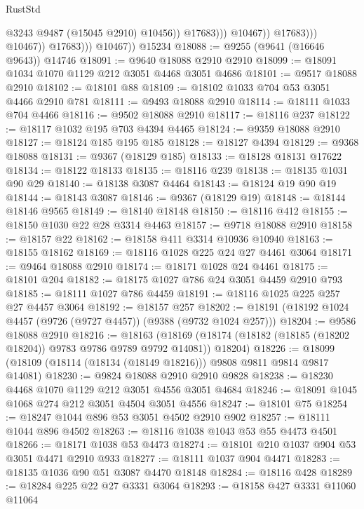 \begin{lexlean}{RustStd}
\begin{coremodule}
                                      @3243
                                      @9487
                                      (@15045 @2910)
                                      @10456))
                                  @17683)))
                            @10467))
                        @17683)))
                  @10467))
              @17683)))
        @10467))
    @15234
@18088 := @9255 (@9641 (@16646 @9643)) @14746
@18091 := @9640 @18088 @2910 @2910
@18099 := @18091 @1034 @1070 @1129 @212 @3051 @4468 @3051 @4686
@18101 := @9517 @18088 @2910
@18102 := @18101 @88
@18109 := @18102 @1033 @704 @53 @3051 @4466 @2910 @781
@18111 := @9493 @18088 @2910
@18114 := @18111 @1033 @704 @4466
@18116 := @9502 @18088 @2910
@18117 := @18116 @237
@18122 := @18117 @1032 @195 @703 @4394 @4465
@18124 := @9359 @18088 @2910
@18127 := @18124 @185 @195 @185
@18128 := @18127 @4394
@18129 := @9368 @18088
@18131 := @9367 (@18129 @185)
@18133 := @18128 @18131 @17622
@18134 := @18122 @18133
@18135 := @18116 @239
@18138 := @18135 @1031 @90 @29
@18140 := @18138 @3087 @4464
@18143 := @18124 @19 @90 @19
@18144 := @18143 @3087
@18146 := @9367 (@18129 @19)
@18148 := @18144 @18146 @9565
@18149 := @18140 @18148
@18150 := @18116 @412
@18155 := @18150 @1030 @22 @28 @3314 @4463
@18157 := @9718 @18088 @2910
@18158 := @18157 @22
@18162 := @18158 @411 @3314 @10936 @10940
@18163 := @18155 @18162
@18169 := @18116 @1028 @225 @24 @27 @4461 @3064
@18171 := @9464 @18088 @2910
@18174 := @18171 @1028 @24 @4461
@18175 := @18101 @204
@18182 := @18175 @1027 @786 @24 @3051 @4459 @2910 @793
@18185 := @18111 @1027 @786 @4459
@18191 := @18116 @1025 @225 @257 @27 @4457 @3064
@18192 := @18157 @257
@18202 := @18191 (@18192 @1024 @4457 (@9726 (@9727 @4457)) (@9388 (@9732 @1024 @257)))
@18204 := @9586 @18088 @2910
@18216 := @18163
    (@18169 (@18174 (@18182 (@18185 (@18202 @18204)) @9783 @9786 @9789 @9792 @14081)) @18204)
@18226 := @18099 (@18109 (@18114 (@18134 (@18149 @18216))) @9808 @9811 @9814 @9817 @14081)
@18230 := @9824 @18088 @2910 @2910 @9828
@18238 := @18230 @4468 @1070 @1129 @212 @3051 @4556 @3051 @4684
@18246 := @18091 @1045 @1068 @274 @212 @3051 @4504 @3051 @4556
@18247 := @18101 @75
@18254 := @18247 @1044 @896 @53 @3051 @4502 @2910 @902
@18257 := @18111 @1044 @896 @4502
@18263 := @18116 @1038 @1043 @53 @55 @4473 @4501
@18266 := @18171 @1038 @53 @4473
@18274 := @18101 @210 @1037 @904 @53 @3051 @4471 @2910 @933
@18277 := @18111 @1037 @904 @4471
@18283 := @18135 @1036 @90 @51 @3087 @4470 @18148
@18284 := @18116 @428
@18289 := @18284 @225 @22 @27 @3331 @3064
@18293 := @18158 @427 @3331 @11060 @11064

\end{coremodule}
\end{lexlean}
